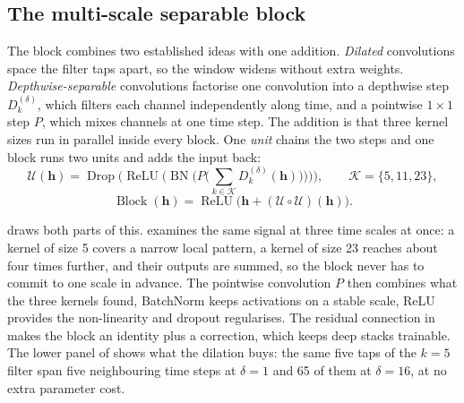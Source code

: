 \subsection{The multi-scale separable block}
\label{sec:arch:block}

The block combines two established ideas with one addition. \emph{Dilated} convolutions
\citep{bai2018tcn} space the filter taps apart, so the window widens without extra weights.
\emph{Depthwise-separable} convolutions \citep{chollet2017xception, howard2017mobilenets} factorise
one convolution into a depthwise step $D_k^{(\delta)}$, which filters each channel independently
along time, and a pointwise $1\times1$ step $P$, which mixes channels at one time step. The addition
is that three kernel sizes run in parallel inside every block. One \emph{unit} chains the two steps
and one block runs two units and adds the input back:
\begin{equation}
  \mathcal{U}(\mathbf{h})
  = \operatorname{Drop}\Big(\operatorname{ReLU}\Big(\operatorname{BN}\Big(
      P\Big(\textstyle\sum_{k \in \mathcal{K}} D_k^{(\delta)}(\mathbf{h})\Big)\Big)\Big)\Big),
  \qquad \mathcal{K} = \{5, 11, 23\},
  \label{eq:unit}
\end{equation}
\begin{equation}
  \operatorname{Block}(\mathbf{h}) = \operatorname{ReLU}\big(\mathbf{h} +
  (\mathcal{U} \circ \mathcal{U})(\mathbf{h})\big).
  \label{eq:block}
\end{equation}

 draws both parts of this.  examines the same signal at three
time scales at once: a kernel of size 5 covers a narrow local pattern, a kernel of size 23 reaches
about four times further, and their outputs are summed, so the block never has to commit to one
scale in advance. The pointwise convolution $P$ then combines what the three kernels found,
BatchNorm \citep{ioffe2015batchnorm} keeps activations on a stable scale, ReLU provides the
non-linearity and dropout regularises. The residual connection in  makes the block an
identity plus a correction, which keeps deep stacks trainable. The lower panel of
 shows what the dilation buys: the same five taps of the $k=5$ filter span five
neighbouring time steps at $\delta = 1$ and 65 of them at $\delta = 16$, at no extra parameter
cost.

